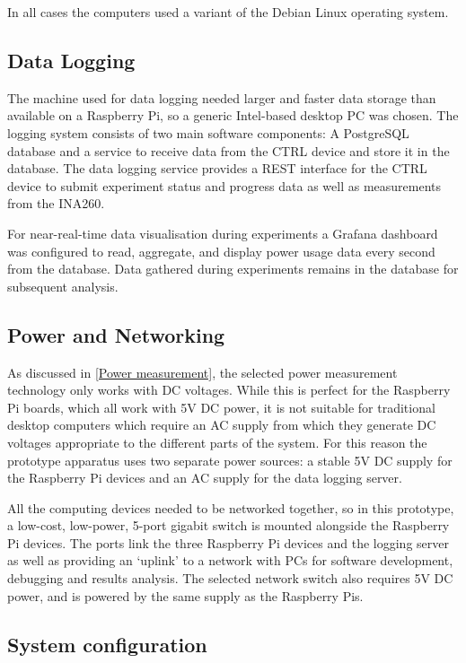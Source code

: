 In all cases the computers used a variant of the Debian Linux operating system.

\subsection{Data Logging}

The machine used for data logging needed larger and faster data storage than available on a Raspberry Pi, so a generic Intel-based desktop PC was chosen. The logging system consists of two main software components: A PostgreSQL database and a service to receive data from the CTRL device and store it in the database. The data logging service provides a REST \citep{Fielding2000} interface for the CTRL device to submit experiment status and progress data as well as measurements from the INA260. 

For near-real-time data visualisation during experiments a Grafana dashboard \citep{Grafana} was configured to read, aggregate, and display power usage data every second from the database. Data gathered during experiments remains in the database for subsequent analysis.

\subsection{Power and Networking}

As discussed in \autoref{Power measurement}, the selected power measurement technology only works with DC voltages. While this is perfect for the Raspberry Pi boards, which all work with 5V DC power, it is not suitable for traditional desktop computers which require an AC supply from which they generate DC voltages appropriate to the different parts of the system. For this reason the prototype apparatus uses two separate power sources: a stable 5V DC supply for the Raspberry Pi devices and an AC supply for the data logging server.

All the computing devices needed to be networked together, so in this prototype, a low-cost, low-power, 5-port gigabit switch is mounted alongside the Raspberry Pi devices. The ports link the three Raspberry Pi devices and the logging server as well as providing an `uplink' to a network with PCs for software development, debugging and results analysis. The selected network switch also requires 5V DC power, and is powered by the same supply as the Raspberry Pis.

\subsection{System configuration}

